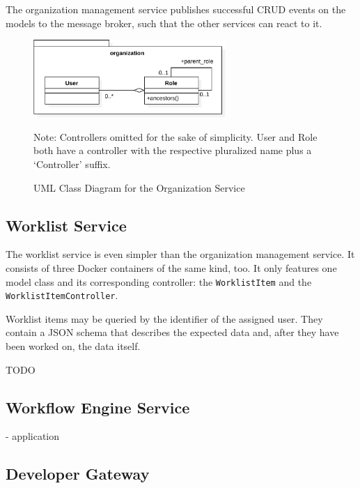       The organization management service publishes successful CRUD events on the models to the message broker, such that the other services can react to it.

    \begin{figure}[htbp]
      \centering
      \includegraphics[width=0.65\textwidth]{content/images/class_diagram_organization-crop.pdf}
      \caption*{\scriptsize Note: Controllers omitted for the sake of simplicity. User and Role both have a controller with the respective pluralized name plus a `Controller' suffix.}
      \caption{UML Class Diagram for the Organization Service}
      \label{fig:uml_class_diagram_organization}
    \end{figure}

  \subsection{Worklist Service} %
    \label{sub:worklist_service}
      The worklist service is even simpler than the organization management service. It consists of three Docker containers of the same kind, too. It only features one model class and its corresponding controller: the \texttt{WorklistItem} and the \texttt{WorklistItemController}.

      Worklist items may be queried by the identifier of the assigned user. They contain a JSON schema that describes the expected data and, after they have been worked on, the data itself.

      TODO

  \subsection{Workflow Engine Service} %
    \label{sub:workflow_engine_service}
      - application

  \subsection{Developer Gateway} %
    \label{sub:developer_gateway}

